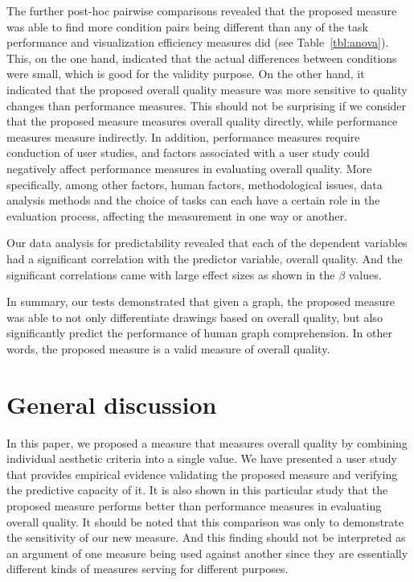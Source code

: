 \documentclass[conference,letterpaper]{IEEEtran}
\begin{document}
The further post-hoc pairwise comparisons revealed that the proposed measure was able to find more condition pairs being  different than any of the task performance and visualization efficiency measures did (see Table~\ref{tbl:anova}). This, on the one hand, indicated that the actual differences between conditions were small, which is good for the validity purpose. On the other hand, it indicated that the proposed overall quality measure was more sensitive to quality changes than performance measures. This should not be surprising if we consider that the proposed measure measures overall quality directly, while performance measures measure indirectly. In addition, performance measures require conduction of user studies, and factors associated with a user study could negatively affect performance measures in evaluating overall quality. More specifically, among other factors, human factors, methodological issues, data analysis methods and the choice of tasks can each have a certain role in the evaluation process, affecting the measurement in one way or another.

Our data analysis for predictability revealed that each of the dependent variables had a significant correlation with the predictor variable, overall quality. And the significant correlations came with large effect sizes as shown in the $\beta$ values. 

In summary, our tests demonstrated that given a graph, the proposed measure was able to not only differentiate drawings based on overall quality, but also significantly predict the performance of human graph comprehension. In other words, the proposed measure is a valid measure of overall quality. 

\section{General discussion}

In this paper, we proposed a measure that measures overall quality by combining individual aesthetic criteria into a single value. We have presented a user study that provides empirical evidence validating the proposed measure and verifying the predictive capacity of it. It is also shown in this particular study that the proposed measure performs better than performance measures in evaluating overall quality. It should be noted that this comparison was only to demonstrate the sensitivity of our new measure. And this finding should not be interpreted as an argument of one measure being used against another since they are essentially different kinds of measures serving for different purposes.
\end{document}
